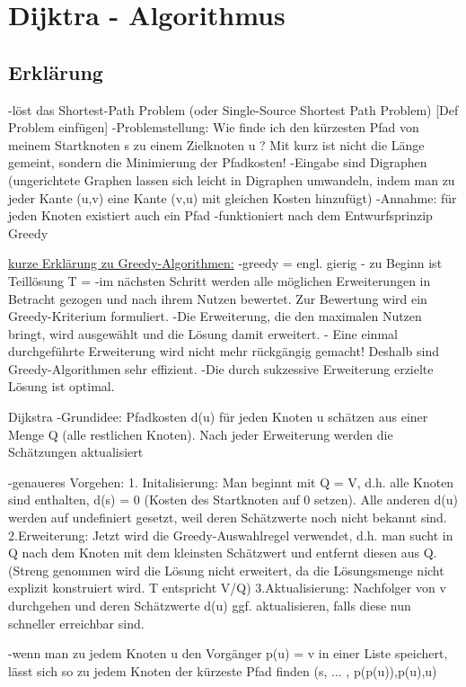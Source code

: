 \chapter{Dijktra - Algorithmus}

\section{Erklärung}

-löst das Shortest-Path Problem (oder Single-Source Shortest Path Problem)
[Def Problem einfügen]
-Problemstellung: Wie finde ich den kürzesten Pfad von meinem Startknoten s zu einem Zielknoten u ? Mit kurz ist nicht die Länge gemeint, sondern die Minimierung der Pfadkosten!
-Eingabe sind Digraphen (ungerichtete Graphen lassen sich leicht in Digraphen umwandeln, indem man zu jeder Kante (u,v) eine Kante (v,u) mit gleichen Kosten hinzufügt)
-Annahme: für jeden Knoten existiert auch ein Pfad
-funktioniert nach dem Entwurfsprinzip Greedy

\underline{kurze Erklärung zu Greedy-Algorithmen:}
-greedy = engl. gierig
- zu Beginn  ist Teillösung T = \emptyset
-im nächsten Schritt werden alle möglichen Erweiterungen in Betracht gezogen und nach ihrem Nutzen bewertet. Zur Bewertung wird ein Greedy-Kriterium formuliert.
-Die Erweiterung, die den maximalen Nutzen bringt, wird ausgewählt und die Lösung damit erweitert. 
- Eine einmal durchgeführte Erweiterung wird nicht mehr rückgängig gemacht! Deshalb sind Greedy-Algorithmen sehr effizient.
-Die durch sukzessive Erweiterung erzielte Lösung ist optimal.

Dijkstra 
-Grundidee:  Pfadkosten d(u) für jeden Knoten u schätzen aus einer Menge Q (alle restlichen Knoten). Nach jeder Erweiterung werden die Schätzungen aktualisiert

-genaueres Vorgehen:
1. Initalisierung: Man beginnt mit Q = V, d.h. alle Knoten sind enthalten, d(s) = 0 (Kosten des Startknoten auf 0 setzen). Alle anderen d(u) werden auf undefiniert gesetzt, weil deren Schätzwerte noch nicht bekannt sind.
2.Erweiterung: Jetzt wird die Greedy-Auswahlregel verwendet, d.h. man sucht in Q nach dem Knoten mit dem kleinsten Schätzwert und entfernt diesen aus Q. (Streng genommen wird die Lösung nicht erweitert, da die Lösungsmenge nicht explizit konstruiert wird. T entspricht V/Q)
3.Aktualisierung: Nachfolger von v durchgehen und deren Schätzwerte d(u) ggf. aktualisieren, falls diese nun schneller erreichbar sind.

-wenn man zu jedem Knoten u den Vorgänger p(u) = v in einer Liste speichert, lässt sich so zu jedem Knoten der kürzeste Pfad finden 
(s, ... , p(p(u)),p(u),u) 


